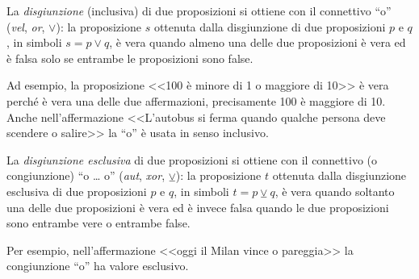 La \emph{disgiunzione} (inclusiva) di due proposizioni si ottiene con il connettivo ``o'' (\emph{vel}, \emph{or}, $\vee$): la proposizione $s$ ottenuta dalla disgiunzione di due proposizioni $p$ e $q$, in simboli $s=p\vee q$, è vera quando almeno una delle due proposizioni è vera ed è falsa solo se entrambe le proposizioni sono false. %

Ad esempio, la proposizione <<100 è minore di 1 o maggiore di 10>> è vera perché è vera una delle due affermazioni, precisamente 100 è maggiore di 10. Anche nell'affermazione <<L'autobus si ferma quando qualche persona deve scendere o salire>> la ``o'' è usata in senso inclusivo.

La \emph{disgiunzione esclusiva} di due proposizioni si ottiene con il connettivo (o congiunzione) ``o \ldots{} o'' (\emph{aut}, \emph{xor}, $\veebar$): la proposizione $t$ ottenuta dalla disgiunzione esclusiva di due proposizioni $p$ e $q$, in simboli $t=p \veebar q$, è vera quando soltanto una delle due proposizioni è vera ed è invece falsa quando le due proposizioni sono entrambe vere o entrambe false. %

Per esempio, nell'affermazione <<oggi il Milan vince o pareggia>> la congiunzione ``o'' ha valore esclusivo.

